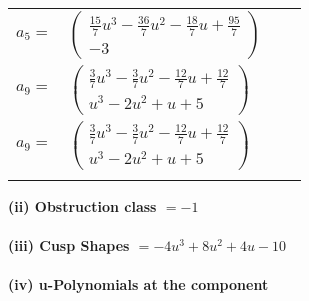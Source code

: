 \documentclass[1p]{elsarticle_modified}
\theoremstyle{definition}
\begin{document}
\begin{tabular}{m{7pt} m{180pt} m{7pt} m{180pt} }
\flushright $a_{5}=$&$\begin{pmatrix}\frac{15}{7} u^3-\frac{36}{7} u^2-\frac{18}{7} u+\frac{95}{7}\\-3\end{pmatrix}$ \\
\flushright $a_{9}=$&$\begin{pmatrix}\frac{3}{7} u^3-\frac{3}{7} u^2-\frac{12}{7} u+\frac{12}{7}\\u^3-2 u^2+u+5\end{pmatrix}$\\ \flushright $a_{9}=$&$\begin{pmatrix}\frac{3}{7} u^3-\frac{3}{7} u^2-\frac{12}{7} u+\frac{12}{7}\\u^3-2 u^2+u+5\end{pmatrix}$\\&\end{tabular}
\flushleft \textbf{(ii) Obstruction class $= -1$}\\~\\
\flushleft \textbf{(iii) Cusp Shapes $= -4 u^3+8 u^2+4 u-10$}\\~\\
\newpage\renewcommand{\arraystretch}{1}
\flushleft \textbf{(iv) u-Polynomials at the component}\newline \\
\end{document}

